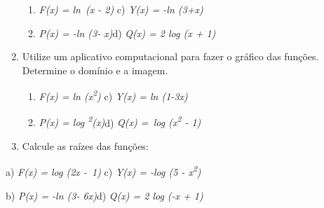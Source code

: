 \documentclass[12pt]{article}
\begin{document}
\begin{enumerate}
\begin{enumerate}
	\item \textit{F(x) = ln\ (x -  2) \tab \tab }\tab c) \textit{Y(x) = -ln (3+x)}\par

	\item \textit{P(x) = -ln (3- x)\tab \tab }\tab d) \textit{Q(x) = 2 log (x + 1)} 
\end{enumerate}\par


\vspace{\baselineskip}
	\item Utilize um aplicativo computacional para fazer o gráfico das funções. Determine o domínio e a imagem.\par

\begin{enumerate}
	\item \textit{F(x) = ln (x\textsuperscript{2}) \tab \tab }\tab c) \textit{Y(x) = ln (1-3x)}\par

	\item \textit{P(x) = log \textsuperscript{2}(x)\tab \tab \tab }d) \textit{Q(x) =\  log (x\textsuperscript{2} - 1)} 
\end{enumerate}\par


\vspace{\baselineskip}
	\item Calcule as raízes das funções:
\end{enumerate}\par

\begin{adjustwidth}{0.75in}{0.0in}
a) \textit{F(x) = log (2x -\  1) \tab }\tab c) \textit{Y(x) = -log (5 - x\textsuperscript{2})}\par

\end{adjustwidth}

\begin{adjustwidth}{0.75in}{0.0in}
b) \textit{P(x) = -ln (3- 6x)\tab \tab }\tab d) \textit{Q(x) = 2 log (-x + 1)}\par

\end{adjustwidth}

\begin{adjustwidth}{0.75in}{0.0in}
 \par

\end{adjustwidth}
\end{document}
